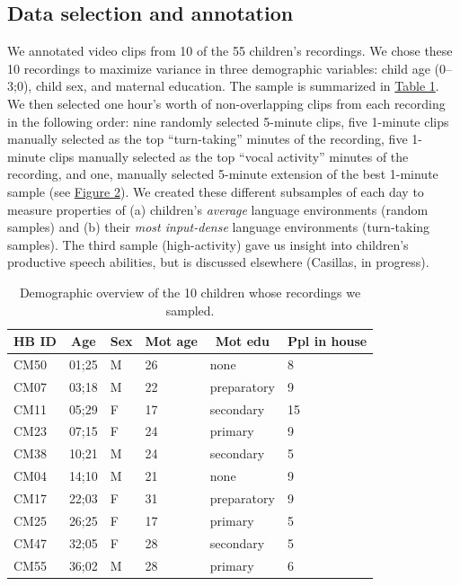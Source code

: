 \documentclass[floatsintext,man]{apa6}
\theoremstyle{definition}
\theoremstyle{definition}
\theoremstyle{definition}
\theoremstyle{remark}
\begin{document}
\subsection{Data selection and annotation}\label{methods-samples}

We annotated video clips from 10 of the 55 children's recordings. We
chose these 10 recordings to maximize variance in three demographic
variables: child age (0--3;0), child sex, and maternal education. The
sample is summarized in \protect\hyperlink{tab1}{Table 1}. We then
selected one hour's worth of non-overlapping clips from each recording
in the following order: nine randomly selected 5-minute clips, five
1-minute clips manually selected as the top \enquote{turn-taking}
minutes of the recording, five 1-minute clips manually selected as the
top \enquote{vocal activity} minutes of the recording, and one, manually
selected 5-minute extension of the best 1-minute sample (see
\protect\hyperlink{fig2}{Figure 2}). We created these different
subsamples of each day to measure properties of (a) children's
\emph{average} language environments (random samples) and (b) their
\emph{most input-dense} language environments (turn-taking samples). The
third sample (high-activity) gave us insight into children's productive
speech abilities, but is discussed elsewhere (Casillas, in progress).

\begin{table}[tbp]
\begin{center}
\begin{threeparttable}
\caption{\label{tab:tab1}Demographic overview of the 10 children whose recordings we sampled.}
\begin{tabular}{llllll}
\toprule
HB ID & \multicolumn{1}{c}{Age} & \multicolumn{1}{c}{Sex} & \multicolumn{1}{c}{Mot age} & \multicolumn{1}{c}{Mot edu} & \multicolumn{1}{c}{Ppl in house}\\
\midrule
CM50 & 01;25 & M & 26 & none & 8\\
CM07 & 03;18 & M & 22 & preparatory & 9\\
CM11 & 05;29 & F & 17 & secondary & 15\\
CM23 & 07;15 & F & 24 & primary & 9\\
CM38 & 10;21 & M & 24 & secondary & 5\\
CM04 & 14;10 & M & 21 & none & 9\\
CM17 & 22;03 & F & 31 & preparatory & 9\\
CM25 & 26;25 & F & 17 & primary & 5\\
CM47 & 32;05 & F & 28 & secondary & 5\\
CM55 & 36;02 & M & 28 & primary & 6\\
\bottomrule
\end{tabular}
\end{threeparttable}
\end{center}
\end{table}
\end{document}
